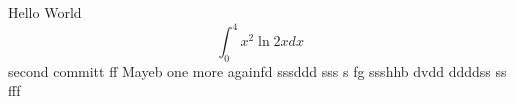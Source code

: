 \documentclass{article}
\begin{document}
Hello World
$$\int_0^4 x^2 \ln{2x}dx$$
second committ  ff
Mayeb
one more
againfd
sssddd sss
s fg
ssshhb dvdd ddddss ss fff
\end{document}
